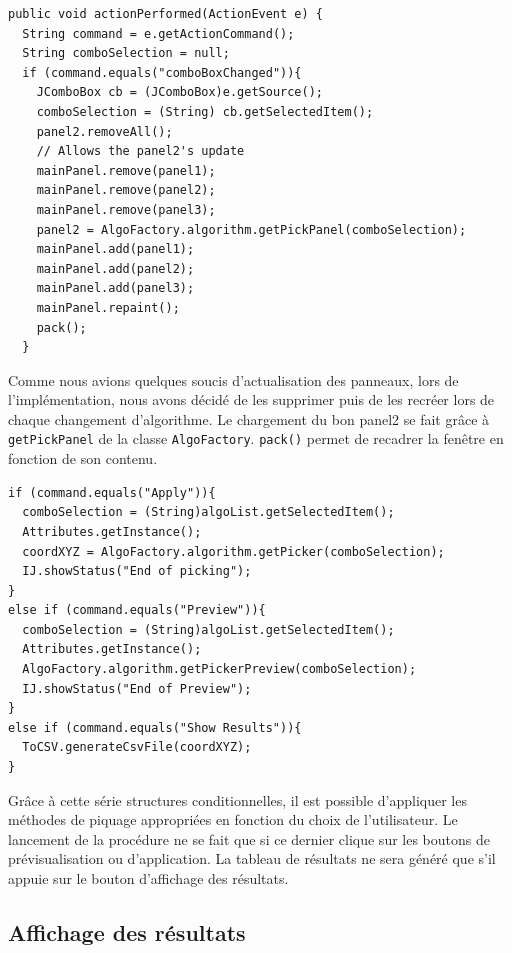 \begin{small}
\begin{lstlisting}
public void actionPerformed(ActionEvent e) {
  String command = e.getActionCommand();
  String comboSelection = null;
  if (command.equals("comboBoxChanged")){
    JComboBox cb = (JComboBox)e.getSource();
    comboSelection = (String) cb.getSelectedItem();
    panel2.removeAll();
    // Allows the panel2's update
    mainPanel.remove(panel1);
    mainPanel.remove(panel2);
    mainPanel.remove(panel3);
    panel2 = AlgoFactory.algorithm.getPickPanel(comboSelection);
    mainPanel.add(panel1);
    mainPanel.add(panel2);
    mainPanel.add(panel3);
    mainPanel.repaint();
    pack();
  }
\end{lstlisting}
\end{small}	

Comme nous avions quelques soucis d'actualisation des panneaux, lors de l'implémentation, nous avons décidé de les supprimer puis de les recréer lors de chaque changement d'algorithme. Le chargement du bon panel2 se fait gr\^ace à \texttt{getPickPanel} de la classe \texttt{AlgoFactory}. \texttt{pack()} permet de recadrer la fenêtre en fonction de son contenu. 

\begin{small}
\begin{lstlisting}
if (command.equals("Apply")){
  comboSelection = (String)algoList.getSelectedItem();
  Attributes.getInstance();
  coordXYZ = AlgoFactory.algorithm.getPicker(comboSelection);
  IJ.showStatus("End of picking");
}
else if (command.equals("Preview")){
  comboSelection = (String)algoList.getSelectedItem();
  Attributes.getInstance();
  AlgoFactory.algorithm.getPickerPreview(comboSelection);
  IJ.showStatus("End of Preview");
}
else if (command.equals("Show Results")){
  ToCSV.generateCsvFile(coordXYZ);
}
\end{lstlisting}
\end{small}	

Grâce à cette série structures conditionnelles, il est possible d'appliquer les méthodes de piquage appropriées en fonction du choix de l'utilisateur. Le lancement de la procédure ne se fait que si ce dernier clique sur les boutons de prévisualisation ou d'application. La tableau de résultats ne sera généré que s'il appuie sur le bouton d'affichage des résultats. 

\subsection{Affichage des résultats}

